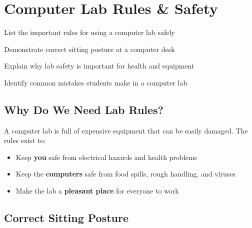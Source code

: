 
\chapter{Computer Lab Rules \& Safety}
\label{ch:lab-rules}

\begin{objectives}
  \item List the important rules for using a computer lab safely
  \item Demonstrate correct sitting posture at a computer desk
  \item Explain why lab safety is important for health and equipment
  \item Identify common mistakes students make in a computer lab
\end{objectives}


\section{Why Do We Need Lab Rules?}
\label{sec:why-rules}

A computer lab is full of expensive equipment that can be easily damaged. The rules exist to:
\begin{itemize}[leftmargin=*, label={\textcolor{ModuleBlue}{\faAngleRight}}, itemsep=2pt]
  \item Keep \textbf{you} safe from electrical hazards and health problems
  \item Keep the \textbf{computers} safe from food spills, rough handling, and viruses
  \item Make the lab a \textbf{pleasant place} for everyone to work
\end{itemize}

\section{Correct Sitting Posture}
\label{sec:posture}

